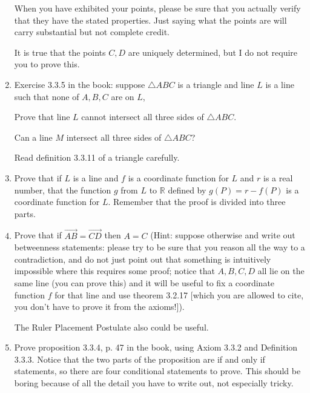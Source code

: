 \documentclass[12pt]{article}
\begin{document}
\begin{enumerate}
When you have exhibited your points, please be sure that you actually verify that they have the stated properties.  Just saying what the points are will carry substantial but not complete credit.

It is true that the points $C,D$ are uniquely determined, but I do not require you to prove this.

\newpage

\item  Exercise 3.3.5 in the book:  suppose $\triangle ABC$ is a triangle and line $L$ is a line such that none of $A,B,C$ are on $L$,

Prove that line $L$ cannot intersect all three sides of $\triangle ABC$.

Can a line $M$ intersect all three sides of  $\triangle ABC$?

Read definition 3.3.11 of a triangle carefully.

\newpage

\item  Prove that if $L$ is a line and $f$ is a coordinate function for $L$ and $r$ is a real number, that the function $g$ from
$L$ to $\mathbb R$ defined by $g(P) = r-f(P)$ is a coordinate function for $L$.  Remember that the proof is divided into three parts.

\newpage


\item Prove that if $\overrightarrow{AB} = \overrightarrow{CD}$ then $A=C$ (Hint:  suppose otherwise and write out betweenness statements:  please try to be sure that you reason all the way to a contradiction, and do not just point out that something is intuitively impossible where this requires some proof;  notice that
$A,B,C,D$ all lie on the same line (you can prove this) and it will be useful to fix a coordinate function $f$ for that line and use theorem 3.2.17 [which you are allowed to cite, you don't have to prove it from the axioms!]).

The Ruler Placement Postulate also could be useful.

\newpage

\item Prove  proposition 3.3.4, p. 47 in the book,  using Axiom 3.3.2 and Definition 3.3.3.  Notice that the two parts of the proposition are if and only if statements, so there are four conditional statements to prove.  This should be boring because of all the detail you have to write out, not especially tricky.

\newpage

\end{enumerate}
\end{document}
